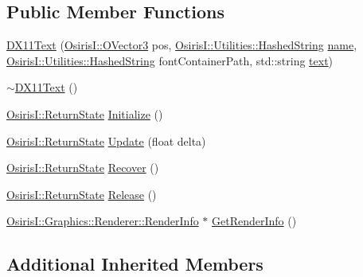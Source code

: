 \subsection*{Public Member Functions}
\begin{DoxyCompactItemize}
\item 
\hyperlink{class_osiris_i_1_1_graphics_1_1_actors_1_1_d_x11_text_afdae53e9f02a812e255b0b5d801069a2}{D\-X11\-Text} (\hyperlink{struct_osiris_i_1_1_o_vector3}{Osiris\-I\-::\-O\-Vector3} pos, \hyperlink{class_osiris_i_1_1_utilities_1_1_hashed_string}{Osiris\-I\-::\-Utilities\-::\-Hashed\-String} \hyperlink{class_osiris_i_1_1_i_osiris_object_a6a3324b9c5ea3afabc9f3ffd9b666db9}{name}, \hyperlink{class_osiris_i_1_1_utilities_1_1_hashed_string}{Osiris\-I\-::\-Utilities\-::\-Hashed\-String} font\-Container\-Path, std\-::string \hyperlink{class_osiris_i_1_1_graphics_1_1_actors_1_1_i_text_ac61379d2b25119354434d62ba327d882}{text})
\item 
\hyperlink{class_osiris_i_1_1_graphics_1_1_actors_1_1_d_x11_text_affdd5e4aebcf30b7f8be311902c43ab6}{$\sim$\-D\-X11\-Text} ()
\item 
\hyperlink{namespace_osiris_i_a8f53bf938dc75c65c6a529694514013e}{Osiris\-I\-::\-Return\-State} \hyperlink{class_osiris_i_1_1_graphics_1_1_actors_1_1_d_x11_text_a7f47295a0df8523cd07acc6253727379}{Initialize} ()
\item 
\hyperlink{namespace_osiris_i_a8f53bf938dc75c65c6a529694514013e}{Osiris\-I\-::\-Return\-State} \hyperlink{class_osiris_i_1_1_graphics_1_1_actors_1_1_d_x11_text_a25c9e887c011c946e273d9a0a8ecc8ca}{Update} (float delta)
\item 
\hyperlink{namespace_osiris_i_a8f53bf938dc75c65c6a529694514013e}{Osiris\-I\-::\-Return\-State} \hyperlink{class_osiris_i_1_1_graphics_1_1_actors_1_1_d_x11_text_a750ac636809eb36c4f9a0051e07623e2}{Recover} ()
\item 
\hyperlink{namespace_osiris_i_a8f53bf938dc75c65c6a529694514013e}{Osiris\-I\-::\-Return\-State} \hyperlink{class_osiris_i_1_1_graphics_1_1_actors_1_1_d_x11_text_ae4ac4dcca8326f60984c9611e29f44a3}{Release} ()
\item 
\hyperlink{struct_osiris_i_1_1_graphics_1_1_renderer_1_1_render_info}{Osiris\-I\-::\-Graphics\-::\-Renderer\-::\-Render\-Info} $\ast$ \hyperlink{class_osiris_i_1_1_graphics_1_1_actors_1_1_d_x11_text_af27027d7d2c40bfbc363a12422597277}{Get\-Render\-Info} ()
\end{DoxyCompactItemize}
\subsection*{Additional Inherited Members}


